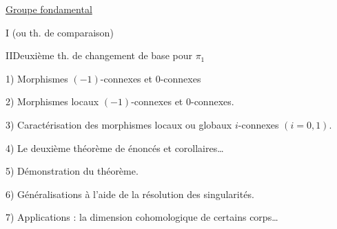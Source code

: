 \uline{Groupe fondamental}

I\quad {}
(ou th. de comparaison)

II\quad Deuxième th. de changement de base pour $\pi_1$

1) Morphismes $(-1)$-connexes et $0$-connexes

2) Morphismes locaux $(-1)$-connexes et $0$-connexes.

3)  Caractérisation des morphismes locaux ou globaux $i$-connexes $(i=0,1)$.

4) Le deuxième théorème de   énoncés et corollaires\ldots

5)  Démonstration du théorème.

6) Généralisations à l'aide de la résolution des singularités.

7) Applications : la dimension cohomologique de certains corps\ldots
